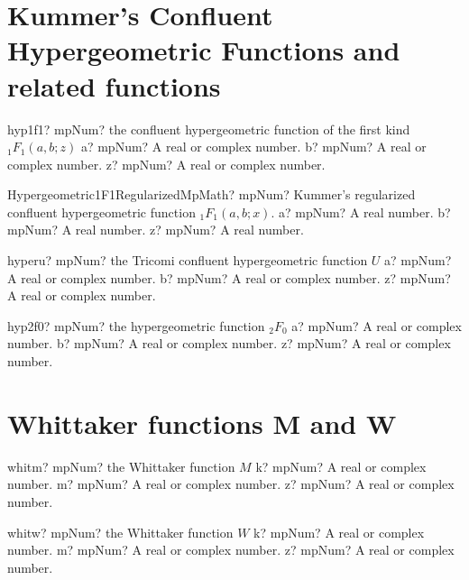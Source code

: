 \documentclass[12pt,a4paper,openany]{book}
\begin{document}
\section{Kummer's Confluent Hypergeometric Functions and related functions}

\begin{mpFunctionsExtract}
\mpFunctionThree
{hyp1f1? mpNum? the confluent hypergeometric function of the first kind ${}_1F_1(a,b;z)$}
{a? mpNum? A real or complex number.}
{b? mpNum? A real or complex number.}
{z? mpNum? A real or complex number.}
\end{mpFunctionsExtract}

\begin{mpFunctionsExtract}
\mpFunctionThreeNotImplemented
{Hypergeometric1F1RegularizedMpMath? mpNum? Kummer's regularized confluent hypergeometric function ${}_1F_1(a, b; x)$.}
{a? mpNum? A real number.}
{b? mpNum? A real number.}
{z? mpNum? A real number.}
\end{mpFunctionsExtract}

\begin{mpFunctionsExtract}
\mpFunctionThree
{hyperu? mpNum? the Tricomi confluent hypergeometric function $U$}
{a? mpNum? A real or complex number.}
{b? mpNum? A real or complex number.}
{z? mpNum? A real or complex number.}
\end{mpFunctionsExtract}

\begin{mpFunctionsExtract}
\mpFunctionThree
{hyp2f0? mpNum? the hypergeometric function ${}_2F_0$}
{a? mpNum? A real or complex number.}
{b? mpNum? A real or complex number.}
{z? mpNum? A real or complex number.}
\end{mpFunctionsExtract}

\section{Whittaker functions M and W}

\begin{mpFunctionsExtract}
\mpFunctionThree
{whitm? mpNum? the Whittaker function $M$}
{k? mpNum? A real or complex number.}
{m? mpNum? A real or complex number.}
{z? mpNum? A real or complex number.}
\end{mpFunctionsExtract}

\begin{mpFunctionsExtract}
\mpFunctionThree
{whitw? mpNum? the Whittaker function $W$}
{k? mpNum? A real or complex number.}
{m? mpNum? A real or complex number.}
{z? mpNum? A real or complex number.}
\end{mpFunctionsExtract}
\end{document}
